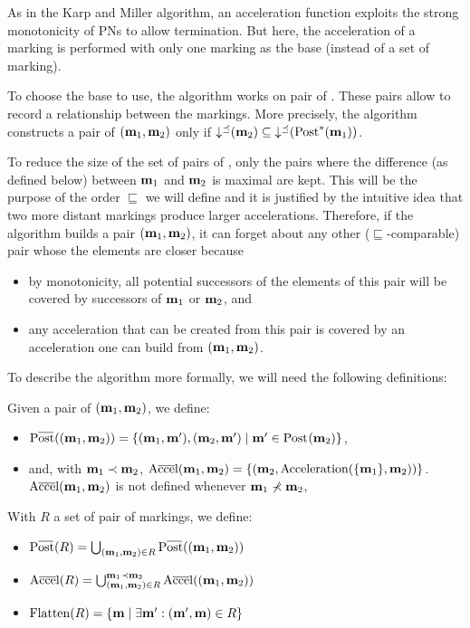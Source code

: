 As in the Karp and Miller algorithm, an acceleration function exploits the strong monotonicity of \acp{PN} to allow termination.
But here, the acceleration of a marking is performed with only one marking as the base (instead of a set of marking).

To choose the base to use, the algorithm works on pair of \omarks.
These pairs allow to record a relationship between the markings.
More precisely, the algorithm constructs a pair of \omarks $(\mathbf{m}_1, \mathbf{m}_2)$ only if $\operatorname{\downarrow^\preceq}(\mathbf{m}_2) \subseteq \operatorname{\downarrow^\preceq}(\operatorname{Post}^*_{}(\mathbf{m}_1))$.

To reduce the size of the set of pairs of \omarks, only the pairs where the difference (as defined below) between $\mathbf{m}_1$ and $\mathbf{m}_2$ is maximal are kept.
This will be the purpose of the order $\sqsubseteq$ we will define and it is justified by the intuitive idea that two more distant markings produce larger accelerations.
Therefore, if the algorithm builds a pair $(\mathbf{m}_1, \mathbf{m}_2)$, it can forget about any other ($\sqsubseteq$-comparable) pair whose the elements are closer because
\begin{itemize}
  \item by monotonicity, all potential successors of the elements of this pair will be covered by successors of $\mathbf{m}_1$ or $\mathbf{m}_2$, and
  \item any acceleration that can be created from this pair is covered by an acceleration one can build from $(\mathbf{m}_1, \mathbf{m}_2)$.
\end{itemize}

To describe the algorithm more formally, we will need the following definitions:

Given a pair of \omarks $(\mathbf{m}_1, \mathbf{m}_2)$, we define:
\begin{itemize}
  \item $\Postb((\mar_1, \mar_2)) = \{(\mar_1, \mar'), (\mar_2, \mar') \mid \mar' \in \post{\mar_2}\}$,
  \item and, with $\mathbf{m}_1 \prec \mathbf{m}_2$, $\operatorname{A\overline{cce}l}(\mathbf{m}_1, \mathbf{m}_2) = \{(\mathbf{m}_2, \operatorname{Acceleration}(\{\mathbf{m}_1\}, \mathbf{m}_2))\}$.
    $\operatorname{A\overline{cce}l}(\mathbf{m}_1, \mathbf{m}_2)$ is not defined whenever $\mathbf{m}_1 \nprec \mathbf{m}_2$,
\end{itemize}

With $R$ a set of pair of markings, we define:
\begin{itemize}
  \item $\Postb(R) = \bigcup_{(\mar_1, \mar_2) \in R} \Postb((\mar_1, \mar_2))$
  \item $\operatorname{A\overline{cce}l}(R) = \bigcup_{(\mathbf{m}_1, \mathbf{m}_2) \in R}^{\mathbf{m}_1 \prec \mathbf{m}_2} \operatorname{A\overline{cce}l}((\mathbf{m}_1, \mathbf{m}_2))$
  \item $\operatorname{Flatten}(R) = \{\mathbf{m} \mid \exists \mathbf{m}' : (\mathbf{m}', \mathbf{m}) \in R\}$
\end{itemize}


